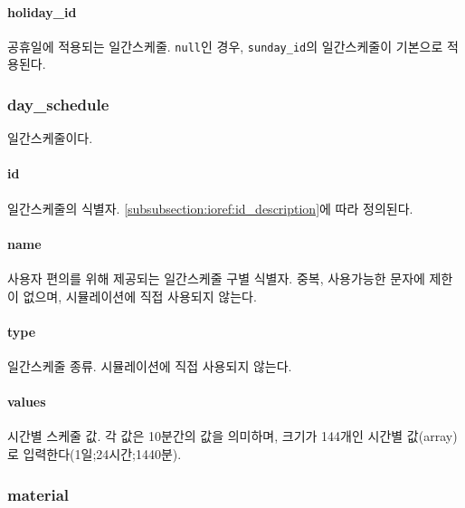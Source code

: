 \paragraph{holiday\_id} 공휴일에 적용되는 일간스케줄. \texttt{null}인 경우, \texttt{sunday\_id}의 일간스케줄이 기본으로 적용된다.

\subsubsection{day\_schedule} \label{subsubsection:ioref:dayschedule}
일간스케줄이다.

\paragraph{id} 일간스케줄의 식별자. \ref{subsubsection:ioref:id_description}에 따라 정의된다.

\paragraph{name} 사용자 편의를 위해 제공되는 일간스케줄 구별 식별자. 중복, 사용가능한 문자에 제한이 없으며, 시뮬레이션에 직접 사용되지 않는다.

\paragraph{type} 일간스케줄 종류. 시뮬레이션에 직접 사용되지 않는다.

\paragraph{values} 시간별 스케줄 값. 각 값은 10분간의 값을 의미하며, 크기가 144개인 시간별 값(array)로 입력한다(1일;24시간;1440분).

\subsubsection{material} \label{subsubsection:ioref:material}


